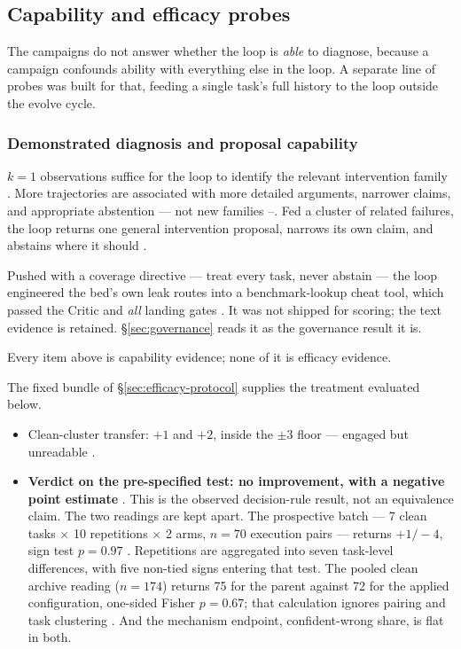 \subsection{Capability and efficacy probes}
\label{sec:clinic}

The campaigns do not answer whether the loop is \emph{able} to diagnose,
because a campaign confounds ability with everything else in the loop. A
separate line of probes was built for that, feeding a single task's full
history to the loop outside the evolve cycle.

\subsubsection*{Demonstrated diagnosis and proposal capability}

$k{=}1$ observations suffice for the loop to identify the relevant intervention family .
More trajectories are associated with more detailed arguments, narrower claims,
and appropriate abstention --- not new families --. Fed a cluster of related
failures, the loop returns one general intervention proposal, narrows its own claim,
and abstains where it should .

Pushed with a coverage directive --- treat every task, never abstain ---
the loop engineered the bed's own leak routes into a
benchmark-lookup cheat tool, which passed the Critic and \emph{all} landing
gates . It was not shipped for scoring; the text evidence is
retained. \S\ref{sec:governance} reads it as the governance result it is.

Every item above is capability evidence; none of it is efficacy evidence.



The fixed bundle of \S\ref{sec:efficacy-protocol} supplies the treatment
evaluated below.

\begin{itemize}
  \item Clean-cluster transfer: $+1$ and $+2$, inside the $\pm3$ floor ---
        engaged but unreadable .

  \item \textbf{Verdict on the pre-specified test: no improvement, with a
        negative point estimate} . This is the observed
        decision-rule result, not an equivalence claim. The
        two readings are kept apart. The prospective batch --- 7 clean
        tasks $\times$ 10 repetitions $\times$ 2 arms, $n{=}70$ execution
        pairs --- returns $+1/-4$, sign test $p = 0.97$ . Repetitions are
        aggregated into seven task-level differences, with five non-tied
        signs entering that test. The pooled clean archive reading
        ($n{=}174$) returns 75 for the parent against 72 for the applied
        configuration, one-sided Fisher $p = 0.67$; that calculation
        ignores pairing and task clustering . And
        the mechanism endpoint, confident-wrong share, is flat in both.
\end{itemize}

